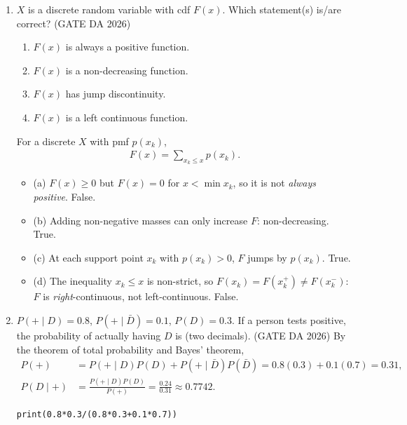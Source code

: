 \begin{enumerate}[label=\textbf{Q.\arabic*},leftmargin=*,start=1]
\item[\textbf{Q.54}] $X$ is a discrete random variable with cdf $F(x)$. Which
statement(s) is/are correct?
\hfill (GATE DA 2026)
\begin{enumerate}[label=(\alph*),itemsep=0pt]
 \item $F(x)$ is always a positive function.
 \item $F(x)$ is a non-decreasing function.
 \item $F(x)$ has jump discontinuity.
 \item $F(x)$ is a left continuous function.
\end{enumerate}
\solution
For a discrete $X$ with pmf $p(x_k)$,
\begin{align}
F(x)=\sum_{x_k\le x}p(x_k).
\end{align}
\begin{itemize}
 \item (a) $F(x)\ge0$ but $F(x)=0$ for $x<\min x_k$, so it is not \emph{always positive}. False.
 \item (b) Adding non-negative masses can only increase $F$: non-decreasing. True.
 \item (c) At each support point $x_k$ with $p(x_k)>0$, $F$ jumps by $p(x_k)$. True.
 \item (d) The inequality $x_k\le x$ is non-strict, so $F(x_k)=F(x_k^+)\neq F(x_k^-)$: $F$ is
 \emph{right}-continuous, not left-continuous. False.
\end{itemize}

\item[\textbf{Q.57}] $P(+\mid D)=0.8$, $P(+\mid \bar D)=0.1$, $P(D)=0.3$. If a
person tests positive, the probability of actually having $D$ is
\underline{\hspace{1.5cm}} (two decimals).
\hfill (GATE DA 2026)
\solution
By the theorem of total probability and Bayes' theorem,
\begin{align}
P(+)&=P(+\mid D)P(D)+P(+\mid\bar D)P(\bar D)=0.8(0.3)+0.1(0.7)=0.31,\\
P(D\mid +)&=\frac{P(+\mid D)P(D)}{P(+)}=\frac{0.24}{0.31}\approx0.7742 .
\end{align}
\begin{lstlisting}
print(0.8*0.3/(0.8*0.3+0.1*0.7))
\end{lstlisting}


\end{enumerate}
